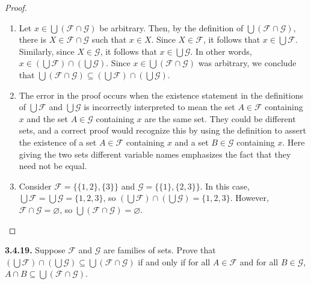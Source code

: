\documentclass[12pt]{amsart}
\newenvironment{statement}[1]{\smallskip\noindent\color[rgb]{.6627, .3529, .6314} {\bf #1.}}{}
\theoremstyle{definition}
\theoremstyle{remark}
\begin{document}
\begin{proof}
\hfill
\begin{enumerate}
	\item Let $x \in \bigcup (\mathcal{F} \cap \mathcal{G})$ be arbitrary.
	Then, by the definition of $\bigcup (\mathcal{F} \cap \mathcal{G})$, there is
	$X \in \mathcal{F} \cap \mathcal{G}$ such that $x \in X$.
	Since $X \in \mathcal{F}$, it follows that $x \in \bigcup \mathcal{F}$.
	Similarly, since $X \in \mathcal{G}$, it follows that $x \in \bigcup \mathcal{G}$.
	In other words, $x \in \left( \bigcup \mathcal{F} \right) \cap \left( \bigcup \mathcal{G} \right)$.
	Since $x \in \bigcup (\mathcal{F} \cap \mathcal{G})$ was arbitrary, we conclude
	that $\bigcup (\mathcal{F} \cap \mathcal{G}) \subseteq
	\left( \bigcup \mathcal{F} \right) \cap \left( \bigcup \mathcal{G} \right)$.
	
	\item The error in the proof occurs when the existence statement in the definitions of 
	$\bigcup \mathcal{F}$ and $\bigcup \mathcal{G}$ is incorrectly interpreted to mean
	the set $A \in \mathcal{F}$ containing $x$ and the set $A \in \mathcal{G}$ containing $x$
	are the same set.
	They could be different sets, and a correct proof would recognize this by using the definition
	to assert the existence of a set $A \in \mathcal{F}$ containing $x$ and a set $B \in \mathcal{G}$
	containing $x$.
	Here giving the two sets different variable names emphasizes the fact that they need not
	be equal.
	
	\item Consider $\mathcal{F} = \{ \{1, 2\}, \{3\} \}$ and $\mathcal{G} = \{ \{1\}, \{2, 3\} \}$.
	In this case, $\bigcup \mathcal{F} = \bigcup \mathcal{G} = \{ 1, 2, 3 \}$,
	so $\left( \bigcup \mathcal{F} \right) \cap \left( \bigcup \mathcal{G} \right) = \{ 1, 2, 3 \}$.
	However, $\mathcal{F} \cap \mathcal{G} = \varnothing$, so
	$\bigcup (\mathcal{F} \cap \mathcal{G}) = \varnothing$.
\end{enumerate}
\end{proof}


\begin{statement}{3.4.19}
Suppose $\mathcal{F}$ and $\mathcal{G}$ are families of sets.
Prove that $\left( \bigcup \mathcal{F} \right) \cap \left( \bigcup \mathcal{G} \right) \subseteq \bigcup (\mathcal{F} \cap \mathcal{G})$ if and only if for all $A \in \mathcal{F}$ and for all $B \in \mathcal{G}$, $A \cap B \subseteq \bigcup (\mathcal{F} \cap \mathcal{G})$.
\end{statement}
\end{document}
